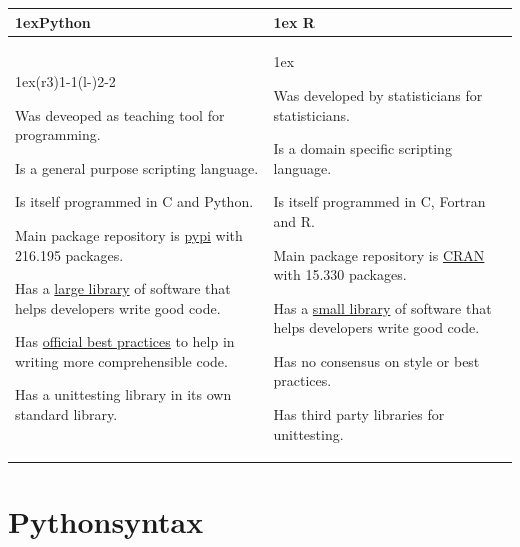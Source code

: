 \documentclass{article}
\begin{document}
\begin{table}[h]
    \begin{tabularx}{\linewidth}{>{\parskip1ex}X@{\kern4\tabcolsep}>{\parskip1ex}X}
        \toprule
        \hfil\bfseries Python
         &
        \hfil\bfseries R
        \\\cmidrule(r{3\tabcolsep}){1-1}\cmidrule(l{-\tabcolsep}){2-2}

        Was deveoped as teaching tool for programming.

        Is a general purpose scripting language.

        Is itself programmed in C and Python.

        Main package repository is \href{https://pypi.org/}{pypi} with 216.195 packages.

        Has a \href{https://github.com/mre/awesome-static-analysis\#python}{large library}
        of software that helps developers write good code.

        Has \href{https://www.python.org/dev/peps/pep-0008/}{official best practices}
        to help in writing more comprehensible code.

        Has a unittesting library in its own standard library.

         &

        Was developed by statisticians for statisticians.

        Is a domain specific scripting language.

        Is itself programmed in C, Fortran and R.

        Main package repository is \href{https://cran.r-project.org/}{CRAN} with 15.330 packages.

        Has a \href{https://github.com/mre/awesome-static-analysis\#r}{small library}
        of software that helps developers write good code.

        Has no consensus on style or best practices.

        Has third party libraries for unittesting.

        \\\bottomrule
    \end{tabularx}
\end{table}

\section{Pythonsyntax}
\end{document}
